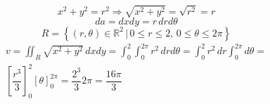 \begin{enumerate}
	\begin{equation*}
		x^2 + y^2 = r^2 \Rightarrow \sqrt{x^2 + y^2} = \sqrt{r^2} = r
	\end{equation*}
	\begin{equation*}
		da = dx dy = r\, dr d\theta
	\end{equation*}
	\begin{equation*}
		R = \left\{(r, \theta) \in \mathbb{R}^2 \,|\, 0 \leq r \leq 2,\, 0 \leq \theta \leq 2\pi\right\}
	\end{equation*}
	\begin{align*}
		v = \iint_R \sqrt{x^2 + y^2}\, dxdy = \int_0^2 \int_0^{2\pi} r^2\, drd\theta = \int_0^2 r^2\, dr \int_0^{2\pi} d\theta =\\ \left[\dfrac{r^3}{3}\right]_0^2 [\theta]_0^{2\pi} = \dfrac{2^3}{3}2\pi = \dfrac{16\pi}{3}
	\end{align*}
\end{enumerate}